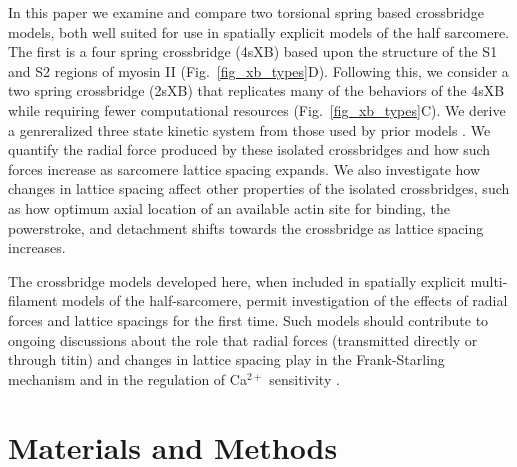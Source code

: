\documentclass[]{article}
\begin{document}
In this paper we examine and compare two torsional spring based crossbridge models, both well suited for use in spatially explicit models of the half sarcomere. 
The first is a four spring crossbridge (4sXB) based upon the structure of the S1 and S2 regions of myosin II (Fig.~\ref{fig_xb_types}D). 
Following this, we consider a two spring crossbridge (2sXB) that replicates many of the behaviors of the 4sXB while requiring fewer computational resources (Fig.~\ref{fig_xb_types}C). 
We derive a genreralized three state kinetic system from those used by prior models \citep{Pate1989, Daniel1998, Tanner2007}. 
We quantify the radial force produced by these isolated crossbridges and how such forces increase as sarcomere lattice spacing expands.
We also investigate how changes in lattice spacing affect other properties of the isolated crossbridges, such as how optimum axial location of an available actin site for binding, the powerstroke, and detachment shifts towards the crossbridge as lattice spacing increases. 

The crossbridge models developed here, when included in spatially explicit multi-filament models of the half-sarcomere, permit investigation of the effects of radial forces and lattice spacings for the first time. 
Such models should contribute to ongoing discussions about the role that radial forces (transmitted directly or through titin) and changes in lattice spacing play in the Frank-Starling mechanism and in the regulation of Ca$^{2+}$ sensitivity \citep{Fuchs2005}. 




\section{Materials and Methods}  %
\end{document}

